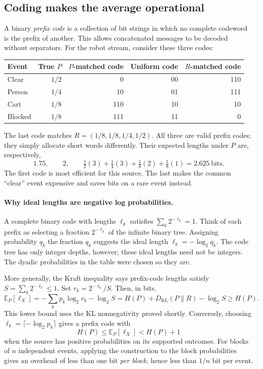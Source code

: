 \subsection{Coding makes the average operational}
A binary \emph{prefix code} is a collection of bit strings in which no complete
codeword is the prefix of another. This allows concatenated messages to be
decoded without separators. For the robot stream, consider these three codes:
\begin{center}
\begin{tabular}{lrrrr}
\toprule
Event & True $P$ & $P$-matched code & Uniform code & $R$-matched code\\
\midrule
Clear & $1/2$ & 0 & 00 & 110\\
Person & $1/4$ & 10 & 01 & 111\\
Cart & $1/8$ & 110 & 10 & 10\\
Blocked & $1/8$ & 111 & 11 & 0\\
\bottomrule
\end{tabular}
\end{center}
The last code matches $R=(1/8,1/8,1/4,1/2)$. All three are valid prefix codes;
they simply allocate short words differently. Their expected lengths under
$P$ are, respectively,
\[
1.75,\qquad2,\qquad
\tfrac12(3)+\tfrac14(3)+\tfrac18(2)+\tfrac18(1)=2.625\ \text{bits}.
\]
The first code is most efficient for this source. The last makes the common
``clear'' event expensive and saves bits on a rare event instead.

\paragraph{Why ideal lengths are negative log probabilities.}
A complete binary code with lengths $\ell_k$ satisfies
$\sum_k2^{-\ell_k}=1$. Think of each prefix as selecting a fraction
$2^{-\ell_k}$ of the infinite binary tree. Assigning probability $q_k$ the
fraction $q_k$ suggests the ideal length $\ell_k=-\log_2q_k$.
The code tree has only integer depths, however; these ideal lengths need not be
integers. The dyadic probabilities in the table were chosen so they are.

More generally, the Kraft inequality says prefix-code lengths satisfy
$S=\sum_k2^{-\ell_k}\leq1$. Set $r_k=2^{-\ell_k}/S$. Then, in bits,
\[
\mathbb E_P[\ell_X]
=-\sum_kp_k\log_2r_k-\log_2S
=H(P)+D_{\mathrm{KL}}(P\|R)-\log_2S\geq H(P).
\]
This lower bound uses the KL nonnegativity proved shortly. Conversely, choosing
$\ell_k=\lceil-\log_2p_k\rceil$ gives a prefix code with
\[
H(P)\leq\mathbb E_P[\ell_X]<H(P)+1
\]
when the source has positive probabilities on its supported outcomes.
For blocks of $n$ independent events, applying the construction to the block
probabilities gives an overhead of less than one bit \emph{per block}, hence
less than $1/n$ bit per event.

